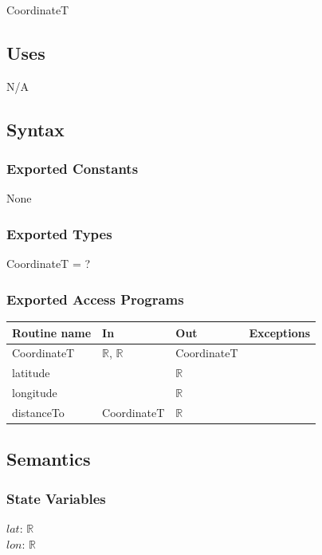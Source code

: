\documentclass[12pt]{article}
\begin{document}
CoordinateT

\subsection* {Uses}

N/A

\subsection* {Syntax}

\subsubsection* {Exported Constants}

None

\subsubsection* {Exported Types}

CoordinateT = ? \\


\subsubsection* {Exported Access Programs}

\begin{tabular}{| l | l | l | l |}
\hline
\textbf{Routine name} & \textbf{In} & \textbf{Out} & \textbf{Exceptions}\\
\hline
CoordinateT & $\mathbb{R}$, $\mathbb{R}$ & CoordinateT & \\
\hline
latitude & ~ & $\mathbb{R}$ & ~\\
\hline
longitude & ~ & $\mathbb{R}$ & ~\\
\hline
distanceTo & CoordinateT & $\mathbb{R}$ & ~\\
\hline
\end{tabular}

\subsection* {Semantics}

\subsubsection* {State Variables}

$lat$: $\mathbb{R}$\\
$lon$: $\mathbb{R}$
\end{document}
